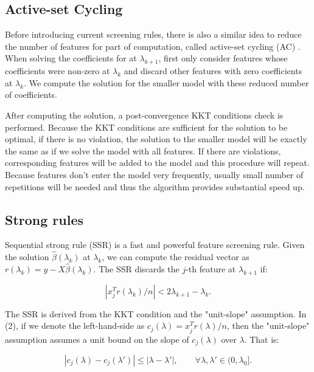 \documentclass{article}
\begin{document}
\subsection{Active-set Cycling}

Before introducing current screening rules, there is also a similar idea to reduce the number of features for part of computation, called active-set cycling (AC) \cite{lee2007efficient}. When solving the coefficients for at $\lambda_{k+1}$, first only consider features whose coefficients were non-zero at $\lambda_k$ and discard other features with zero coefficients at $\lambda_k$. We compute the solution for the smaller model with these reduced number of coefficients.

After computing the solution, a post-convergence KKT conditions check is performed. Because the KKT conditions are sufficient for the solution to be optimal, if there is no violation, the solution to the smaller model will be exactly the same as if we solve the model with all features. If there are violations, corresponding features will be added to the model and this procedure will repeat. Because features don't enter the model very frequently, usually small number of repetitions will be needed and thus the algorithm provides substantial speed up.

\subsection{Strong rules}

Sequential strong rule (SSR) \cite{tibshirani2011regression} is a fast and powerful feature screening rule. Given the solution $\hat{\beta}(\lambda_k)$ at $\lambda_k$, we can compute the residual vector as $r(\lambda_k)=y-X\hat{\beta}(\lambda_k)$. The SSR discards the $j$-th feature at $\lambda_{k+1}$ if:

\begin{equation}
    |x_j^Tr(\lambda_k)/n|<2\lambda_{k+1}-\lambda_k.
\end{equation}

The SSR is derived from the KKT condition and the "unit-slope" assumption. In (2), if we denote the left-hand-side as $c_j(\lambda)=x_j^Tr(\lambda)/n$, then the "unit-slope" assumption assumes a unit bound on the slope of $c_j(\lambda)$ over $\lambda$. That is:

\begin{equation}
    |c_j(\lambda)-c_j(\lambda')|\leq |\lambda-\lambda'|,\qquad \forall \lambda,\lambda'\in(0,\lambda_0].
\end{equation}
\end{document}
